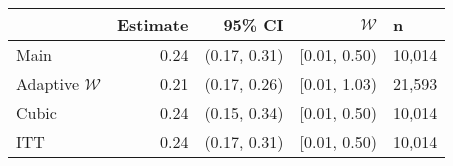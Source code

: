 \begin{tabular}{lrrrl}
  \hline
 & Estimate & 95\% CI & $\mathcal{W}$ & n \\ 
  \hline
Main & 0.24 & (0.17, 0.31) & [0.01, 0.50) & 10,014 \\ 
  Adaptive $\mathcal{W}$ & 0.21 & (0.17, 0.26) & [0.01, 1.03) & 21,593 \\ 
  Cubic & 0.24 & (0.15, 0.34) & [0.01, 0.50) & 10,014 \\ 
  ITT & 0.24 & (0.17, 0.31) & [0.01, 0.50) & 10,014 \\ 
   \hline
\end{tabular}

